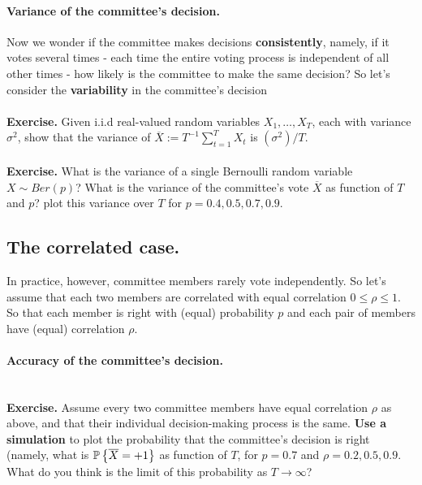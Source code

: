 \paragraph{Variance of the committee's decision.} 
Now we wonder if the committee makes decisions {\bf consistently}, namely, if it
votes several times - each time the entire voting process is independent of all
other times - how likely is the committee to make the same decision?
So let's consider the {\bf variability} in the committee's decision
\\~\\
{\bf Exercise.} Given i.i.d real-valued 
random variables $X_1,\ldots,X_T$, each with variance $\sigma^2$, show that the
variance of $\overline{X}:=T^{-1}\sum_{t=1}^T X_t$ is $(\sigma^2)/T$.
\\~\\
{\bf Exercise.} What is the variance of a single Bernoulli random variable
$X\sim Ber(p)$? What is the variance of the committee's vote $\overline{X}$  as
function of $T$ and $p$? plot this variance over $T$ for $p=0.4,0.5,0.7,0.9$. 



\subsection{The correlated case.}


In practice, however, committee members rarely vote independently. So let's
assume that each two members are correlated with equal correlation $0\leq  \rho
\leq 1 $. So that each member is right with (equal) probability $p$ and each pair of
members have (equal) correlation $\rho$. 

\paragraph{Accuracy of the committee's decision.} 
~\\
{\bf Exercise.} Assume every two committee members have equal correlation $\rho$
as above, and that their individual decision-making process is the same.
{\bf Use a simulation} to plot 
 the probability that the committee's decision is right (namely, what is
  $\mathbb{P}\left\{ \overline{X}=+1 \right\}$ as function of  $T$, for $p=0.7$ 
  and $\rho=0.2, 0.5, 0.9$.
  What do you think is the limit of this probability as $T\to\infty$? 

